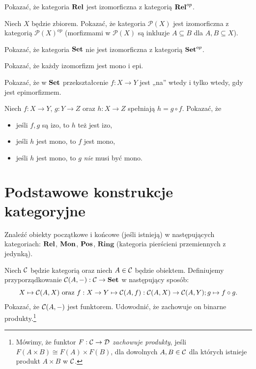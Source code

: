\begin{zadanie}
Pokazać, że kategoria $\mathbf{Rel}$ jest izomorficzna z kategorią $\mathbf{Rel}^{op}$. 
\end{zadanie}

\begin{zadanie}
    Niech $X$ będzie zbiorem. Pokazać, że kategoria $\mathcal{P}(X)$ jest izomorficzna z kategorią $\mathcal{P}(X)^{op}$ (morfizmami w $\mathcal{P}(X)$ są inkluzje $A \subseteq B$ dla $A, B\subseteq X$).  
\end{zadanie}

\begin{zadanie}
Pokazać, że kategoria $\mathbf{Set}$ nie jest izomorficzna z kategorią $\mathbf{Set}^{op}$. 
\end{zadanie}

\begin{zadanie}
Pokazać, że każdy izomorfizm jest mono i epi.
\end{zadanie}

\begin{zadanie}
Pokazać, że w $\mathbf{Set}$ przekształcenie $f:X\to Y$ jest „na” wtedy i tylko wtedy, gdy jest epimorfizmem.
\end{zadanie}

\begin{zadanie}
Niech $f:X\to Y$, $g:Y\to Z$ oraz $h:X\to Z$ spełniają $h= g\circ f$. Pokazać, że 
\begin{itemize}
\item jeśli $f,g$ są izo, to $h$ też jest izo,
\item jeśli $h$ jest mono, to $f$ jest mono,
\item jeśli $h$ jest mono, to $g$ \emph{nie} musi być mono.
\end{itemize}
\end{zadanie}

\clearpage
\section{Podstawowe konstrukcje kategoryjne}

\begin{zadanie}
Znaleźć obiekty początkowe i końcowe (jeśli istnieją) w następujących kategoriach:
$\mathbf{Rel}$,  $\mathbf{Mon}$, $\mathbf{Pos}$, $\mathbf{Ring}$ (kategoria pierścieni przemiennych z jedynką). 
\end{zadanie}

\begin{zadanie}\label{zad:hom-produkty}
Niech $\mathcal{C}$ będzie kategorią oraz niech $A\in \mathcal{C}$ będzie obiektem. Definiujemy przyporządkowanie $\mathcal{C}(A,-):\mathcal{C}\to \mathbf{Set}$ w następujący sposób:
$$
X\mapsto \mathcal{C}(A,X) \text{ oraz } f:X\to Y \mapsto \mathcal{C}(A,f):\mathcal{C}(A,X)\to \mathcal{C}(A,Y);g\mapsto f\circ g. 
$$
Pokazać, że $\mathcal{C}(A,-)$ jest funktorem. Udowodnić, że zachowuje on binarne produkty.\footnote{Mówimy, że funktor $F:\mathcal{C}\to\mathcal{D}$ \emph{zachowuje produkty}, jeśli $F(A\times B) \cong F(A)\times F(B)$, dla dowolnych $A,B\in \mathcal{C}$ dla których istnieje produkt $A\times B$ w $\mathcal{C}$.}
\end{zadanie}

